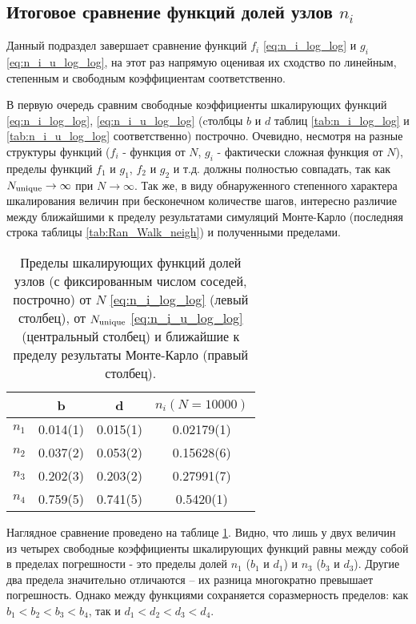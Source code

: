 \subsection{Итоговое сравнение функций долей узлов $n_i$}
\label{sec:n_final}

Данный подраздел завершает сравнение функций $f_i$ \eqref{eq:n_i_log_log} и $g_i$ \eqref{eq:n_i_u_log_log}, на этот раз напрямую оценивая их сходство по линейным, степенным и свободным коэффициентам соответственно.

В первую очередь сравним свободные коэффициенты шкалирующих функций \eqref{eq:n_i_log_log}, \eqref{eq:n_i_u_log_log} (cтолбцы $b$ и $d$ таблиц \ref{tab:n_i_log_log} и \ref{tab:n_i_u_log_log} соответственно) построчно. Очевидно, несмотря на разные структуры функций ($f_i$ - функция от $N$, $g_i$ - фактически сложная функция от $N$), пределы функций $f_1$ и $g_1$, $f_2$ и $g_2$ и т.д. должны полностью совпадать, так как $N_{\textup{unique}} \to \infty$ при $N \to \infty$. Так же, в виду обнаруженного степенного характера шкалирования величин при бесконечном количестве шагов, интересно различие между ближайшими к пределу результатами симуляций Монте-Карло (последняя строка таблицы \ref{tab:Ran_Walk_neigh}) и полученными пределами. 

\begin{table}[h]
\centering
\begin{tabular}{|c|c|c|c|}
\hline
 & b & d & $n_i(N=10000)$ \\ \hline
$n_1$ & 0.014(1) & 0.015(1) & 0.02179(1)\\ \hline
$n_2$ & 0.037(2) & 0.053(2) & 0.15628(6)\\ \hline
$n_3$ & 0.202(3) & 0.203(2) & 0.27991(7)\\ \hline
$n_4$ & 0.759(5) & 0.741(5) & 0.5420(1)\\ \hline
\end{tabular}
\caption{Пределы шкалирующих функций долей узлов (с фиксированным числом соседей, построчно) от $N$ \eqref{eq:n_i_log_log} (левый столбец), от $N_{\textup{unique}}$ \eqref{eq:n_i_u_log_log} (центральный столбец) и ближайшие к пределу результаты Монте-Карло (правый столбец).}
\label{tab:bd_compare}
\end{table}

Наглядное сравнение проведено на таблице \ref{tab:bd_compare}. 
Видно, что лишь у двух величин из четырех свободные коэффициенты шкалирующих функций равны между собой в пределах погрешности - это пределы долей $n_1$ ($b_1$ и $d_1$) и $n_3$ ($b_3$ и $d_3$). 
Другие два предела значительно отличаются -- их разница многократно превышает погрешность.
Однако между функциями сохраняется соразмерность пределов: как $b_1 < b_2 < b_3 < b_4$, так и $d_1 < d_2 < d_3 < d_4$.


